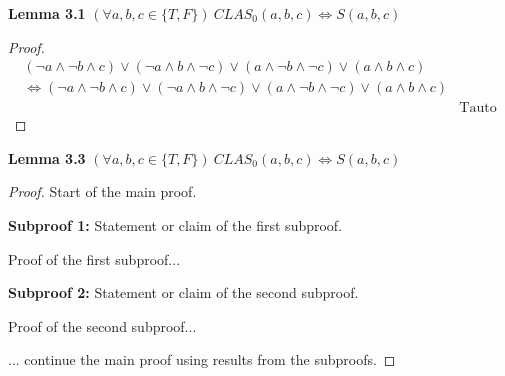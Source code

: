 \documentclass{article}
\begin{document}
\newpage

\noindent \textbf{Lemma 3.1}  $ (\forall a, b, c \in \{T, F\}) \: CLAS_0(a, b, c) \iff S(a, b, c)  $ 
\begin{proof}
	\begin{align*}
	(\lnot a \land \lnot b \land c) \lor (\lnot a \land b \land \lnot c) \lor 
	(a \land \lnot b \land \lnot c) \lor (a \land b \land c) 
	\\ \iff (\lnot a \land \lnot b \land c) \lor 
	(\lnot a \land b \land \lnot c) \lor 
	(a \land \lnot b \land \lnot c) \lor (a \land b \land c) \\
	& \text{Tauto}
	\end{align*}
\end{proof}

\noindent \textbf{Lemma 3.3}  $ (\forall a, b, c \in \{T, F\}) \: CLAS_0(a, b, c) \iff S(a, b, c)  $ 

\begin{proof}
	Start of the main proof.
	
	\textbf{Subproof 1:} Statement or claim of the first subproof.
	
	Proof of the first subproof...
	
	\textbf{Subproof 2:} Statement or claim of the second subproof.
	
	Proof of the second subproof...
	
	... continue the main proof using results from the subproofs.
	
\end{proof}
\end{document}
